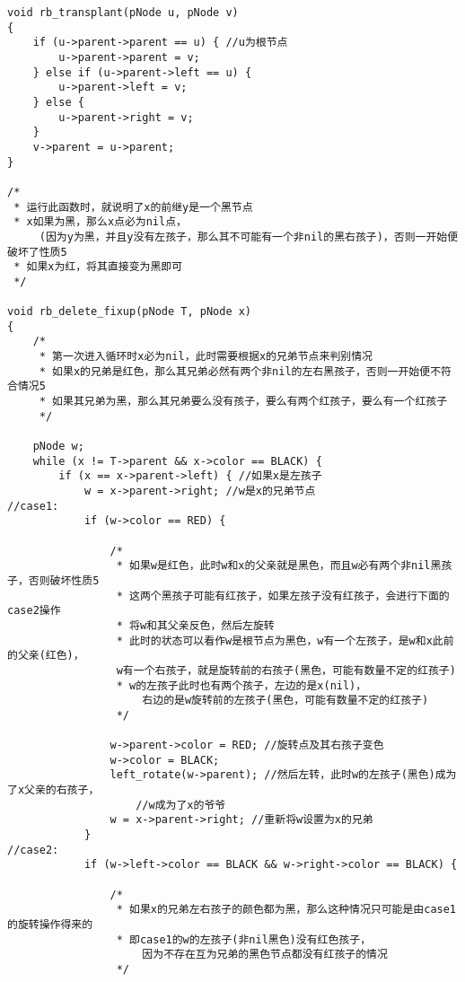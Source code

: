\begin{verbatim}
void rb_transplant(pNode u, pNode v)
{
    if (u->parent->parent == u) { //u为根节点
        u->parent->parent = v;
    } else if (u->parent->left == u) {
        u->parent->left = v;
    } else {
        u->parent->right = v;
    }
    v->parent = u->parent;
}

/*
 * 运行此函数时，就说明了x的前继y是一个黑节点
 * x如果为黑，那么x点必为nil点，
     (因为y为黑，并且y没有左孩子，那么其不可能有一个非nil的黑右孩子)，否则一开始便破坏了性质5
 * 如果x为红，将其直接变为黑即可
 */

void rb_delete_fixup(pNode T, pNode x)
{
    /*
     * 第一次进入循环时x必为nil，此时需要根据x的兄弟节点来判别情况
     * 如果x的兄弟是红色，那么其兄弟必然有两个非nil的左右黑孩子，否则一开始便不符合情况5
     * 如果其兄弟为黑，那么其兄弟要么没有孩子，要么有两个红孩子，要么有一个红孩子
     */

    pNode w;
    while (x != T->parent && x->color == BLACK) {
        if (x == x->parent->left) { //如果x是左孩子
            w = x->parent->right; //w是x的兄弟节点
//case1:
            if (w->color == RED) {

                /*
                 * 如果w是红色，此时w和x的父亲就是黑色，而且w必有两个非nil黑孩子，否则破坏性质5
                 * 这两个黑孩子可能有红孩子，如果左孩子没有红孩子，会进行下面的case2操作
                 * 将w和其父亲反色，然后左旋转
                 * 此时的状态可以看作w是根节点为黑色，w有一个左孩子，是w和x此前的父亲(红色)，
                 w有一个右孩子，就是旋转前的右孩子(黑色，可能有数量不定的红孩子)
                 * w的左孩子此时也有两个孩子，左边的是x(nil)，
                     右边的是w旋转前的左孩子(黑色，可能有数量不定的红孩子)
                 */

                w->parent->color = RED; //旋转点及其右孩子变色
                w->color = BLACK;
                left_rotate(w->parent); //然后左转，此时w的左孩子(黑色)成为了x父亲的右孩子，
                    //w成为了x的爷爷
                w = x->parent->right; //重新将w设置为x的兄弟
            }
//case2:
            if (w->left->color == BLACK && w->right->color == BLACK) {

                /*
                 * 如果x的兄弟左右孩子的颜色都为黑，那么这种情况只可能是由case1的旋转操作得来的
                 * 即case1的w的左孩子(非nil黑色)没有红色孩子，
                     因为不存在互为兄弟的黑色节点都没有红孩子的情况
                 */


\end{verbatim}
